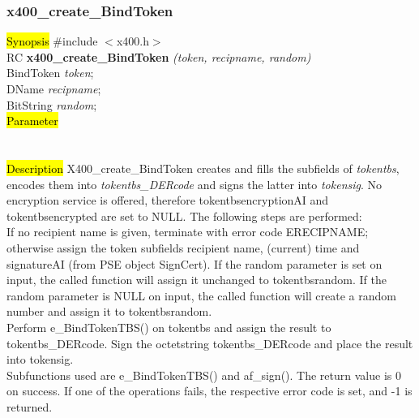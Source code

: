 \subsubsection{x400\_create\_BindToken}
\label{x4_cr_BTok}
\hl{Synopsis}
\#include $<$x400.h$>$ \\ [1ex]
RC {\bf x400\_create\_BindToken}
{\em (token, recipname, random)} \\
BindToken {\em *token};  \\
DName {\em *recipname}; \\
BitString {\em *random};    \\
\hl{Parameter}
 \\[1ex]
 \\[1ex]
 \\[1ex]
\hl{Description}
X400\_create\_BindToken
creates and fills the subfields of {\em token\pf tbs},
encodes them into {\em token\pf tbs\_DERcode} and
signs the latter into {\em token\pf sig}.
No encryption service is offered, therefore
token\pf tbs\pf encryptionAI and token\pf tbs\pf encrypted are set to NULL.
The following steps are performed:
\\
If no recipient name is given, terminate with error code ERECIPNAME;
otherwise assign the token subfields
recipient name,
(current) time and signatureAI (from PSE object SignCert).
If the random parameter is set on input,
the called function will assign it unchanged
to token\pf tbs\pf random.
If the random parameter is NULL on input,
the called function will create a random number and assign it
to token\pf tbs\pf random.
\\
Perform e\_BindTokenTBS() on token\pf tbs and assign the result
to token\pf tbs\_DERcode.
Sign the octetstring token\pf tbs\_DERcode and place the result
into token\pf sig.
\\
Subfunctions used are e\_BindTokenTBS() and af\_sign().
The return value is 0 on success.
If one of the operations fails,
the respective error code is set, and -1 is returned.

